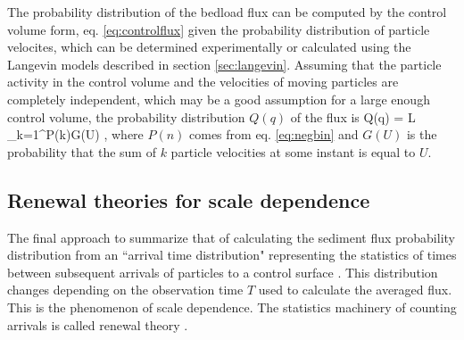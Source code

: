The probability distribution of the bedload flux can be computed by the control volume form, eq. \ref{eq:controlflux} given the probability distribution of particle velocites, which can be determined experimentally \citep{Lajeunesse2010,Fathel2015,Heyman2016} or calculated using the Langevin models described in section \ref{sec:langevin}.
Assuming that the particle activity in the control volume and the velocities of moving particles are completely independent, which may be a good assumption for a large enough control volume, the probability distribution $Q(q)$ of the flux is \citep{Ancey2008,Ancey2014,Ancey2020}
\be Q(q) = L \sum_{k=1}^\infty P(k)G(U) ,\ee
where $P(n)$ comes from eq. \ref{eq:negbin} and $G(U)$ is the probability that the sum of $k$ particle velocities at some instant is equal to $U$.

\subsection{Renewal theories for scale dependence}
\label{sec:renewal}
The final approach to summarize that of calculating the sediment flux probability distribution from an ``arrival time distribution" representing the statistics of times between subsequent arrivals of particles to a control surface \citep{Turowski2010,Ancey2020}. This distribution changes depending on the observation time $T$ used to calculate the averaged flux. This is the phenomenon of scale dependence. The statistics machinery of counting arrivals is called renewal theory \citep{Cox1962}.

